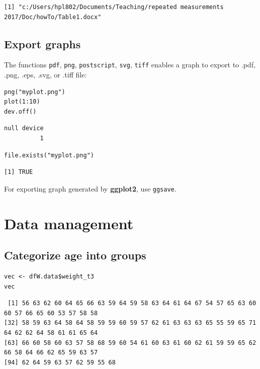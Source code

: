 \documentclass{article}
\begin{document}
\begin{verbatim}
[1] "c:/Users/hpl802/Documents/Teaching/repeated measurements 2017/Doc/howTo/Table1.docx"
\end{verbatim}

\subsection{Export graphs}
\label{sec:org4d1c9e8}

The functions \texttt{pdf}, \texttt{png}, \texttt{postscript}, \texttt{svg}, \texttt{tiff} enables a graph to
export to .pdf, .png, .eps, .svg, or .tiff file:
\lstset{language=r,label= ,caption= ,captionpos=b,numbers=none}
\begin{lstlisting}
png("myplot.png")
plot(1:10)
dev.off()
\end{lstlisting}

\begin{verbatim}
null device 
          1
\end{verbatim}

\lstset{language=r,label= ,caption= ,captionpos=b,numbers=none}
\begin{lstlisting}
file.exists("myplot.png")
\end{lstlisting}

\begin{verbatim}
[1] TRUE
\end{verbatim}

For exporting graph generated by \textbf{ggplot2}, use \texttt{ggsave}.

\section{Data management}
\label{sec:org9c5f4ca}
\subsection{Categorize age into groups}
\label{sec:orgc45568e}
\lstset{language=r,label= ,caption= ,captionpos=b,numbers=none}
\begin{lstlisting}
vec <- dfW.data$weight_t3
vec
\end{lstlisting}

\begin{verbatim}
 [1] 56 63 62 60 64 65 66 63 59 64 59 58 63 64 61 64 67 54 57 65 63 60 60 57 66 65 60 53 57 58 58
[32] 58 59 63 64 58 64 58 59 59 60 59 57 62 61 63 63 63 65 55 59 65 71 64 62 62 64 58 61 61 65 64
[63] 66 60 58 60 63 57 58 68 59 60 54 61 60 63 61 60 62 61 59 59 65 62 66 58 64 66 62 65 59 63 57
[94] 62 64 59 63 57 62 59 55 68
\end{verbatim}
\end{document}
